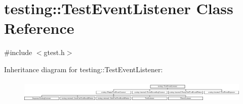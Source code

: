 \hypertarget{classtesting_1_1TestEventListener}{}\section{testing\+::Test\+Event\+Listener Class Reference}
\label{classtesting_1_1TestEventListener}


{\ttfamily \#include $<$gtest.\+h$>$}

Inheritance diagram for testing\+::Test\+Event\+Listener\+:\begin{figure}[H]
\begin{center}
\leavevmode
\includegraphics[height=1.081081cm]{classtesting_1_1TestEventListener}
\end{center}
\end{figure}
